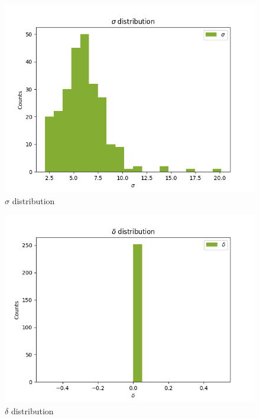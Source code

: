 \documentclass[
]{article}
\begin{document}
\begin{figure}
\centering
\includegraphics{pngplots/param3.png}
\caption{\(\sigma\) distribution}
\end{figure}

\begin{figure}
\centering
\includegraphics{pngplots/param4.png}
\caption{\(\delta\) distribution}
\end{figure}
\end{document}
